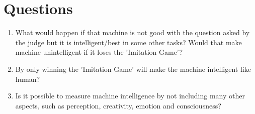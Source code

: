 \documentclass{article}
\begin{document}
\section{Questions}
\begin{enumerate}
  \item What would happen if that machine is not good with the question asked by the judge but it is intelligent/best in some other tasks? Would that make machine unintelligent if it loses the 'Imitation Game'?
  \item By only winning the 'Imitation Game' will make the machine intelligent like human?
  \item Is it possible to measure machine intelligence by not including many other aspects, such as perception, creativity, emotion and consciousness?
\end{enumerate}
\end{document}
